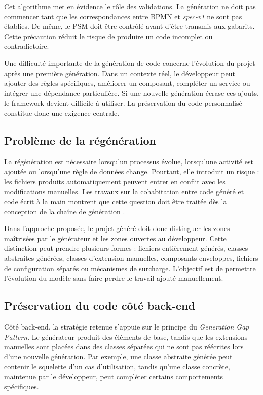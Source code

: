 Cet algorithme met en évidence le rôle des validations. La génération ne doit pas commencer tant que les correspondances entre BPMN et \textit{spec-v1} ne sont pas établies. De même, le PSM doit être contrôlé avant d'être transmis aux gabarits. Cette précaution réduit le risque de produire un code incomplet ou contradictoire.


Une difficulté importante de la génération de code concerne l'évolution du projet après une première génération. Dans un contexte réel, le développeur peut ajouter des règles spécifiques, améliorer un composant, compléter un service ou intégrer une dépendance particulière. Si une nouvelle génération écrase ces ajouts, le framework devient difficile à utiliser. La préservation du code personnalisé constitue donc une exigence centrale.

\subsection{Problème de la régénération}

La régénération est nécessaire lorsqu'un processus évolue, lorsqu'une activité est ajoutée ou lorsqu'une règle de données change. Pourtant, elle introduit un risque : les fichiers produits automatiquement peuvent entrer en conflit avec les modifications manuelles. Les travaux sur la cohabitation entre code généré et code écrit à la main montrent que cette question doit être traitée dès la conception de la chaîne de génération \cite{greifenberg2015,dragas2024}.

Dans l'approche proposée, le projet généré doit donc distinguer les zones maîtrisées par le générateur et les zones ouvertes au développeur. Cette distinction peut prendre plusieurs formes : fichiers entièrement générés, classes abstraites générées, classes d'extension manuelles, composants enveloppes, fichiers de configuration séparés ou mécanismes de surcharge. L'objectif est de permettre l'évolution du modèle sans faire perdre le travail ajouté manuellement.

\subsection{Préservation du code côté back-end}

Côté back-end, la stratégie retenue s'appuie sur le principe du \textit{Generation Gap Pattern}. Le générateur produit des éléments de base, tandis que les extensions manuelles sont placées dans des classes séparées qui ne sont pas réécrites lors d'une nouvelle génération. Par exemple, une classe abstraite générée peut contenir le squelette d'un cas d'utilisation, tandis qu'une classe concrète, maintenue par le développeur, peut compléter certains comportements spécifiques.

